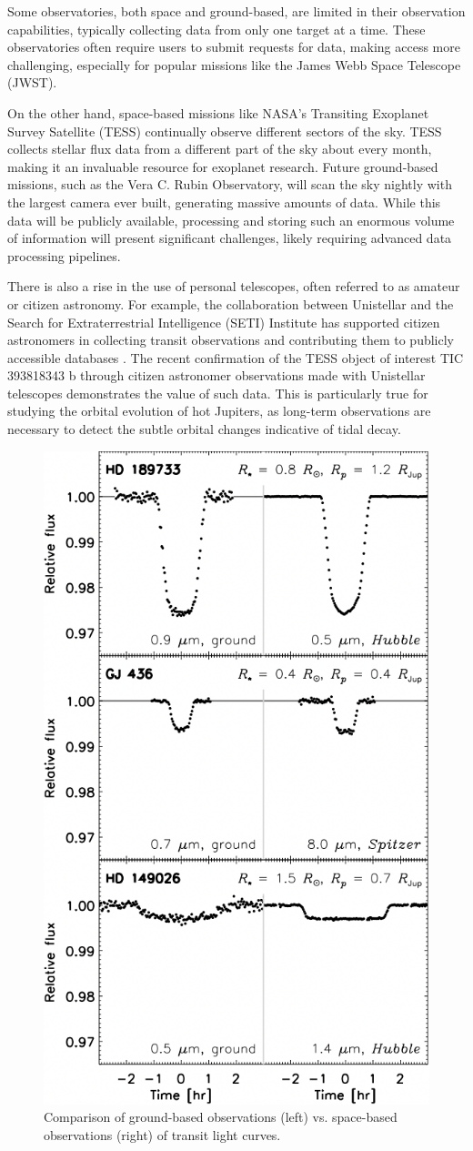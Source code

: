 \documentclass[oneside,12pt]{amsart}
\numberwithin{page}{section}
\begin{document}
Some observatories, both space and ground-based, are limited in their observation capabilities, typically collecting data from only one target at a time. These observatories often require users to submit requests for data, making access more challenging, especially for popular missions like the James Webb Space Telescope (JWST).

On the other hand, space-based missions like NASA's Transiting Exoplanet Survey Satellite (TESS) continually observe different sectors of the sky. TESS collects stellar flux data from a different part of the sky about every month, making it an invaluable resource for exoplanet research. Future ground-based missions, such as the Vera C. Rubin Observatory, will scan the sky nightly with the largest camera ever built, generating massive amounts of data. While this data will be publicly available, processing and storing such an enormous volume of information will present significant challenges, likely requiring advanced data processing pipelines.

There is also a rise in the use of personal telescopes, often referred to as amateur or citizen astronomy. For example, the collaboration between Unistellar and the Search for Extraterrestrial Intelligence (SETI) Institute has supported citizen astronomers in collecting transit observations and contributing them to publicly accessible databases \citep{peluso2023unistellar}. The recent confirmation of the TESS object of interest TIC 393818343 b through citizen astronomer observations made with Unistellar telescopes \citep{sgro2024confirmation} demonstrates the value of such data. This is particularly true for studying the orbital evolution of hot Jupiters, as long-term observations are necessary to detect the subtle orbital changes indicative of tidal decay.

\begin{figure}[htbp]
    \centering
    \includegraphics[width=0.5\linewidth]{figs/winn_fig8.png}
    \caption{Comparison of ground-based observations (left) vs. space-based observations (right) of transit light curves.}
    \label{fig:winn-fig8}
\end{figure}
\end{document}
